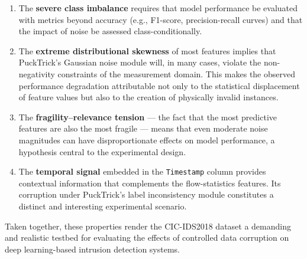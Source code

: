 \begin{enumerate}
  \item The \textbf{severe class imbalance} requires that model performance be
        evaluated with metrics beyond accuracy (e.g., F1-score,
        precision-recall curves) and that the impact of noise be assessed
        class-conditionally.
  \item The \textbf{extreme distributional skewness} of most features implies
        that PuckTrick's Gaussian noise module will, in many cases, violate
        the non-negativity constraints of the measurement domain.  This makes
        the observed performance degradation attributable not only to the
        statistical displacement of feature values but also to the creation of
        physically invalid instances.
  \item The \textbf{fragility–relevance tension} — the fact that the most
        predictive features are also the most fragile — means that even
        moderate noise magnitudes can have disproportionate effects on model
        performance, a hypothesis central to the experimental design.
  \item The \textbf{temporal signal} embedded in the \texttt{Timestamp}
        column provides contextual information that complements the
        flow-statistics features.  Its corruption under PuckTrick's label
        inconsistency module constitutes a distinct and interesting experimental
        scenario.
\end{enumerate}

Taken together, these properties render the CIC-IDS2018 dataset a demanding and
realistic testbed for evaluating the effects of controlled data corruption on
deep learning-based intrusion detection systems.
